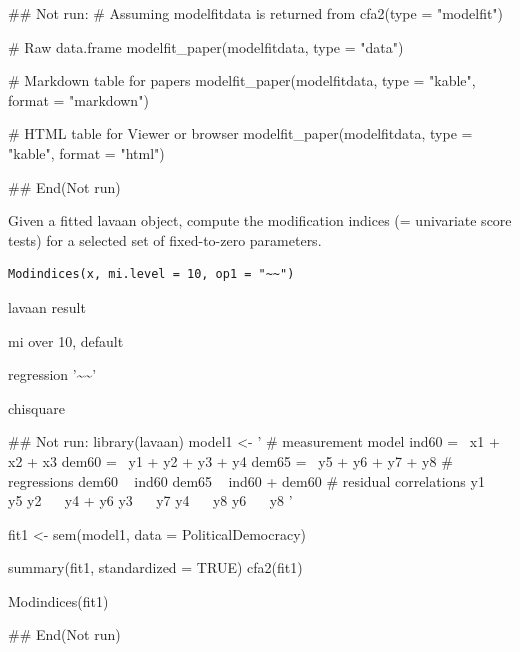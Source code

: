 \documentclass[a4paper]{book}
\begin{document}
%
\begin{Examples}
\begin{ExampleCode}
## Not run: 
# Assuming modelfitdata is returned from cfa2(type = "modelfit")

# Raw data.frame
modelfit_paper(modelfitdata, type = "data")

# Markdown table for papers
modelfit_paper(modelfitdata, type = "kable", format = "markdown")

# HTML table for Viewer or browser
modelfit_paper(modelfitdata, type = "kable", format = "html")

## End(Not run)
\end{ExampleCode}
\end{Examples}
%
\begin{Description}
Given a fitted lavaan object, compute the modification indices (= univariate score tests) for a selected set of fixed-to-zero parameters.
\end{Description}
%
\begin{Usage}
\begin{verbatim}
Modindices(x, mi.level = 10, op1 = "~~")
\end{verbatim}
\end{Usage}
%
\begin{Arguments}
\begin{ldescription}
\item[\code{x}] lavaan result

\item[\code{mi.level}] mi over 10, default

\item[\code{op1}] regression '\textasciitilde{}\textasciitilde{}'
\end{ldescription}
\end{Arguments}
%
\begin{Value}
chisquare
\end{Value}
%
\begin{Examples}
\begin{ExampleCode}
## Not run: 
library(lavaan)
model1 <- '
  # measurement model
    ind60 =~ x1 + x2 + x3
    dem60 =~ y1 + y2 + y3 + y4
    dem65 =~ y5 + y6 + y7 + y8
  # regressions
    dem60 ~ ind60
    dem65 ~ ind60 + dem60
 # residual correlations
    y1 ~~ y5
    y2 ~~ y4 + y6
    y3 ~~ y7
    y4 ~~ y8
    y6 ~~ y8
'

fit1 <- sem(model1, data = PoliticalDemocracy)

 summary(fit1, standardized = TRUE)
cfa2(fit1)

Modindices(fit1)

## End(Not run)



\end{ExampleCode}
\end{Examples}
\end{document}
